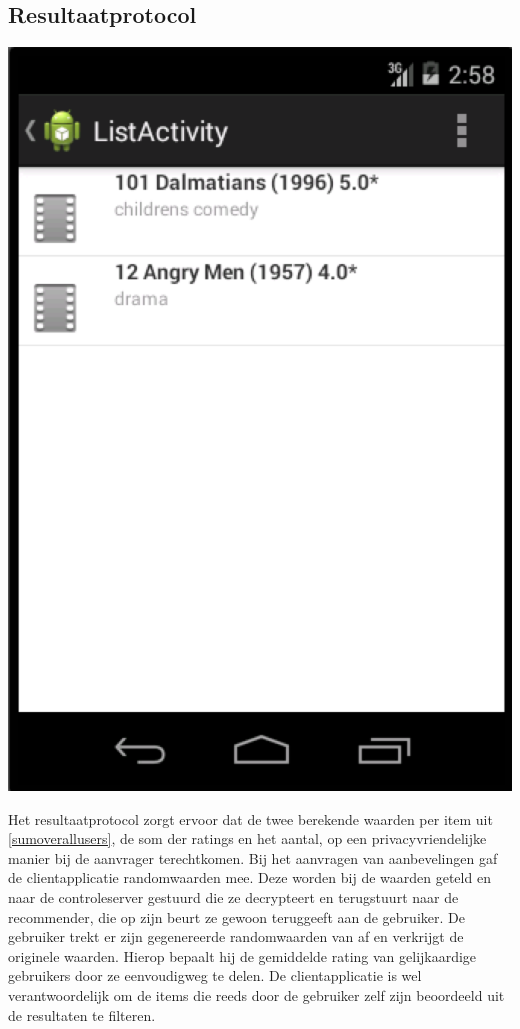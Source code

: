 \subsection{Resultaatprotocol}
\label{result}

\begin{center} 
\centering 
 \includegraphics[scale=0.5]{fig/recommendations}    
    \label{Figuur::recommendations}   
\end{center}

   
Het resultaatprotocol zorgt ervoor dat de twee berekende waarden per item uit \ref{sumoverallusers}, de som der ratings en het aantal, op een privacyvriendelijke manier bij de aanvrager terechtkomen. Bij het aanvragen van aanbevelingen gaf de clientapplicatie randomwaarden mee. Deze worden bij de waarden geteld en naar de controleserver gestuurd die ze decrypteert en terugstuurt naar de recommender, die op zijn beurt ze gewoon teruggeeft aan de gebruiker. De gebruiker trekt er zijn gegenereerde randomwaarden van af en verkrijgt de originele waarden. Hierop bepaalt hij de gemiddelde rating van gelijkaardige gebruikers door ze eenvoudigweg te delen. De clientapplicatie is wel verantwoordelijk om de items die reeds door de gebruiker zelf zijn beoordeeld uit de resultaten te filteren.
